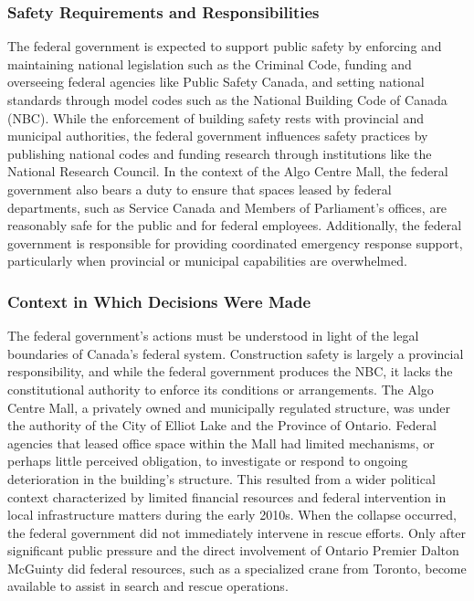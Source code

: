 \documentclass[12pt]{article}
\begin{document}
\subsubsection*{Safety Requirements and Responsibilities}

The federal government is expected to support public safety by enforcing and maintaining national legislation such as the Criminal Code, funding and overseeing federal agencies like Public Safety Canada, and setting national standards through model codes such as the National Building Code of Canada (NBC). While the enforcement of building safety rests with provincial and municipal authorities, the federal government influences safety practices by publishing national codes and funding research through institutions like the National Research Council. In the context of the Algo Centre Mall, the federal government also bears a duty to ensure that spaces leased by federal departments, such as Service Canada and Members of Parliament's offices, are reasonably safe for the public and for federal employees. Additionally, the federal government is responsible for providing coordinated emergency response support, particularly when provincial or municipal capabilities are overwhelmed.

\subsubsection*{Context in Which Decisions Were Made}

The federal government's actions must be understood in light of the legal boundaries of Canada's federal system. Construction safety is largely a provincial responsibility, and while the federal government produces the NBC, it lacks the constitutional authority to enforce its conditions or arrangements. The Algo Centre Mall, a privately owned and municipally regulated structure, was under the authority of the City of Elliot Lake and the Province of Ontario. Federal agencies that leased office space within the Mall had limited mechanisms, or perhaps little perceived obligation, to investigate or respond to ongoing deterioration in the building's structure. This resulted from a wider political context characterized by limited financial resources and federal intervention in local infrastructure matters during the early 2010s. When the collapse occurred, the federal government did not immediately intervene in rescue efforts. Only after significant public pressure and the direct involvement of Ontario Premier Dalton McGuinty did federal resources, such as a specialized crane from Toronto, become available to assist in search and rescue operations.
\end{document}
